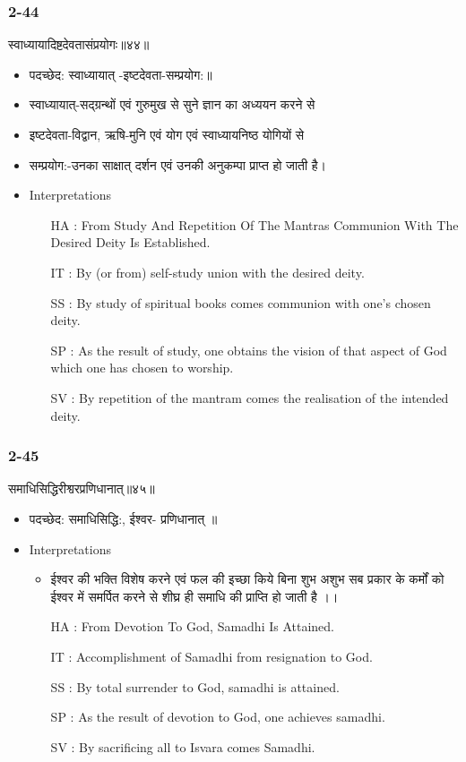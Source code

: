 \begin{frame}[fragile]\frametitle{2-44}
\begin{sanskrit}
स्वाध्यायादिष्टदेवतासंप्रयोगः॥४४॥
\end{sanskrit}

	\begin{itemize}
	\item पदच्छेद: स्वाध्यायात् -इष्टदेवता-सम्प्रयोग:॥
	\item स्वाध्यायात्-सद्ग्रन्थों एवं गुरुमुख से सुने ज्ञान का अध्ययन करने से
	\item इष्टदेवता-विद्वान, ऋषि-मुनि एवं योग एवं स्वाध्यायनिष्ठ योगियों से
	\item सम्प्रयोग:-उनका साक्षात् दर्शन एवं उनकी अनुकम्पा प्राप्त हो जाती है।
	\item Interpretations
		\begin{itemize}
		\item [HA]: From Study And Repetition Of The Mantras Communion With The Desired Deity Is Established.
		\item [IT]: By (or from) self-study union with the desired deity.
		\item [SS]: By study of spiritual books comes communion with one’s chosen deity.
		\item [SP]: As the result of study, one obtains the vision of that aspect of God which one has chosen to worship.
		\item [SV]: By repetition of the mantram comes the realisation of the intended deity. 
		\end{itemize}
	\end{itemize}	
\end{frame}


\begin{frame}[fragile]\frametitle{2-45}
\begin{sanskrit}
समाधिसिद्धिरीश्वरप्रणिधानात्॥४५॥
\end{sanskrit}

	\begin{itemize}
	\item पदच्छेद: समाधिसिद्धि:, ईश्वर- प्रणिधानात् ॥
	\item Interpretations
		\begin{itemize}
		\item ईश्वर की भक्ति विशेष करने एवं फल की इच्छा किये बिना शुभ अशुभ सब प्रकार के कर्मों को ईश्वर में समर्पित करने से शीघ्र ही समाधि की प्राप्ति हो जाती है ।।
		\item [HA]: From Devotion To God, Samadhi Is Attained.
		\item [IT]: Accomplishment of Samadhi from resignation to God.
		\item [SS]: By total surrender to God, samadhi is attained.
		\item [SP]: As the result of devotion to God, one achieves samadhi.
		\item [SV]: By sacrificing all to Isvara comes Samadhi. 
		\end{itemize}
	\end{itemize}	
\end{frame}


